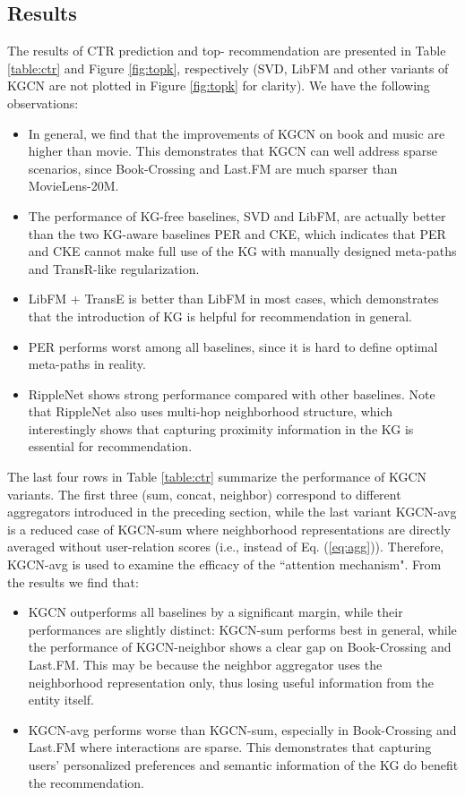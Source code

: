 \documentclass[sigconf]{acmart}
\begin{document}
	\subsection{Results}
		The results of CTR prediction and top- recommendation are presented in Table \ref{table:ctr} and Figure \ref{fig:topk}, respectively (SVD, LibFM and other variants of KGCN are not plotted in Figure \ref{fig:topk} for clarity).
        We have the following observations:
        \begin{itemize}
        	\item
        		In general, we find that the improvements of KGCN on book and music are higher than movie.
        		This demonstrates that KGCN can well address sparse scenarios, since Book-Crossing and Last.FM are much sparser than MovieLens-20M.
        	\item
        		The performance of KG-free baselines, SVD and LibFM, are actually better than the two KG-aware baselines PER and CKE, which indicates that PER and CKE cannot make full use of the KG with manually designed meta-paths and TransR-like regularization.
        	\item
        		LibFM + TransE is better than LibFM in most cases, which demonstrates that the introduction of KG is helpful for recommendation in general.
        	\item
        		PER performs worst among all baselines, since it is hard to define optimal meta-paths in reality.
        	\item
        		RippleNet shows strong performance compared with other baselines.
        		Note that RippleNet also uses multi-hop neighborhood structure, which interestingly shows that capturing proximity information in the KG is essential for recommendation.
        \end{itemize}
        
        The last four rows in Table \ref{table:ctr} summarize the performance of KGCN variants.
        The first three (sum, concat, neighbor) correspond to different aggregators introduced in the preceding section, while the last variant KGCN-avg is a reduced case of KGCN-sum where neighborhood representations are directly averaged without user-relation scores (i.e.,  instead of Eq. (\ref{eq:agg})).
        Therefore, KGCN-avg is used to examine the efficacy of the ``attention mechanism".
        From the results we find that:
        \begin{itemize}
        	\item
        		KGCN outperforms all baselines by a significant margin, while their performances are slightly distinct:
        		KGCN-sum performs best in general, while the performance of KGCN-neighbor shows a clear gap on Book-Crossing and Last.FM.
        		This may be because the neighbor aggregator uses the neighborhood representation only, thus losing useful information from the entity itself.
        	\item
        		KGCN-avg performs worse than KGCN-sum, especially in Book-Crossing and Last.FM where interactions are sparse.
        		This demonstrates that capturing users' personalized preferences and semantic information of the KG do benefit the recommendation.
        \end{itemize}
        
\end{document}
